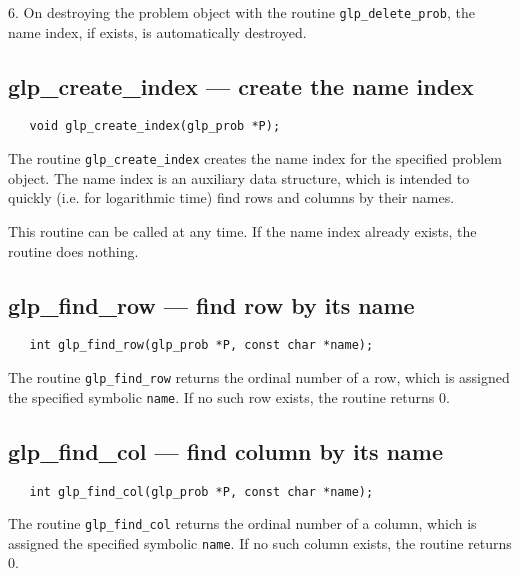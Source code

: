 6. On destroying the problem object with the routine
\verb|glp_delete_prob|, the name index, if exists, is automatically
destroyed.

\subsection{glp\_create\_index --- create the name index}

\synopsis

\begin{verbatim}
   void glp_create_index(glp_prob *P);
\end{verbatim}

\description

The routine \verb|glp_create_index| creates the name index for the
specified problem object. The name index is an auxiliary data
structure, which is intended to quickly (i.e. for logarithmic time)
find rows and columns by their names.

This routine can be called at any time. If the name index already
exists, the routine does nothing.

\newpage

\subsection{glp\_find\_row --- find row by its name}

\synopsis

\begin{verbatim}
   int glp_find_row(glp_prob *P, const char *name);
\end{verbatim}

\returns

The routine \verb|glp_find_row| returns the ordinal number of a row,
which is assigned the specified symbolic \verb|name|. If no such row
exists, the routine returns 0.

\subsection{glp\_find\_col --- find column by its name}

\synopsis

\begin{verbatim}
   int glp_find_col(glp_prob *P, const char *name);
\end{verbatim}

\returns

The routine \verb|glp_find_col| returns the ordinal number of a column,
which is assigned the specified symbolic \verb|name|. If no such column
exists, the routine returns 0.


